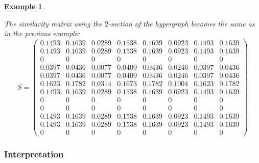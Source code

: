 \documentclass[a4paper,11pt]{report}
\newtheorem{example}[theorem]{Example}
\begin{document}
\begin{example}
\begin{center}
\end{center}
The similarity matrix using the $2$-section of the hypergraph becomes the same as in the previous example:
 $$S = \begin{pmatrix}
0.1493&0.1639&0.0289&0.1538&0.1639&0.0923&0.1493&0.1639\\
0.1493&0.1639&0.0289&0.1538&0.1639&0.0923&0.1493&0.1639\\
0&0&0&0&0&0&0&0\\
0.0397&0.0436&0.0077&0.0409&0.0436&0.0246&0.0397&0.0436\\
0.0397&0.0436&0.0077&0.0409&0.0436&0.0246&0.0397&0.0436\\
0.1623&0.1782&0.0314&0.1673&0.1782&0.1004&0.1623&0.1782\\
0.1493&0.1639&0.0289&0.1538&0.1639&0.0923&0.1493&0.1639\\
0&0&0&0&0&0&0&0\\
0&0&0&0&0&0&0&0\\
0.1493&0.1639&0.0289&0.1538&0.1639&0.0923&0.1493&0.1639\\
0.1493&0.1639&0.0289&0.1538&0.1639&0.0923&0.1493&0.1639\\
0&0&0&0&0&0&0&0
   \end{pmatrix}$$

\end{example}
\subsubsection{Interpretation}
\end{document}
